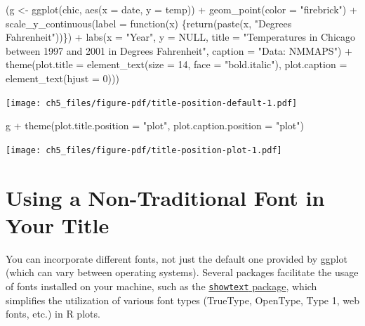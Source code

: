 \documentclass[
  letterpaper,
  DIV=11,
  numbers=noendperiod]{scrreprt}
\newenvironment{Shaded}{\begin{snugshade}}{\end{snugshade}}
\newcommand{\AttributeTok}[1]{\textcolor[rgb]{0.40,0.45,0.13}{#1}}
\newcommand{\ConstantTok}[1]{\textcolor[rgb]{0.56,0.35,0.01}{#1}}
\newcommand{\ControlFlowTok}[1]{\textcolor[rgb]{0.00,0.23,0.31}{#1}}
\newcommand{\DecValTok}[1]{\textcolor[rgb]{0.68,0.00,0.00}{#1}}
\newcommand{\FunctionTok}[1]{\textcolor[rgb]{0.28,0.35,0.67}{#1}}
\newcommand{\NormalTok}[1]{\textcolor[rgb]{0.00,0.23,0.31}{#1}}
\newcommand{\OtherTok}[1]{\textcolor[rgb]{0.00,0.23,0.31}{#1}}
\newcommand{\SpecialCharTok}[1]{\textcolor[rgb]{0.37,0.37,0.37}{#1}}
\newcommand{\StringTok}[1]{\textcolor[rgb]{0.13,0.47,0.30}{#1}}
\begin{document}
\begin{Shaded}
\begin{Highlighting}[]
\NormalTok{(g }\OtherTok{\textless{}{-}} \FunctionTok{ggplot}\NormalTok{(chic, }\FunctionTok{aes}\NormalTok{(}\AttributeTok{x =}\NormalTok{ date, }\AttributeTok{y =}\NormalTok{ temp)) }\SpecialCharTok{+}
  \FunctionTok{geom\_point}\NormalTok{(}\AttributeTok{color =} \StringTok{"firebrick"}\NormalTok{) }\SpecialCharTok{+}
  \FunctionTok{scale\_y\_continuous}\NormalTok{(}\AttributeTok{label =} \ControlFlowTok{function}\NormalTok{(x) \{}\FunctionTok{return}\NormalTok{(}\FunctionTok{paste}\NormalTok{(x, }\StringTok{"Degrees Fahrenheit"}\NormalTok{))\}) }\SpecialCharTok{+}
  \FunctionTok{labs}\NormalTok{(}\AttributeTok{x =} \StringTok{"Year"}\NormalTok{, }\AttributeTok{y =} \ConstantTok{NULL}\NormalTok{,}
       \AttributeTok{title =} \StringTok{"Temperatures in Chicago between 1997 and 2001 in Degrees Fahrenheit"}\NormalTok{,}
       \AttributeTok{caption =} \StringTok{"Data: NMMAPS"}\NormalTok{) }\SpecialCharTok{+}
  \FunctionTok{theme}\NormalTok{(}\AttributeTok{plot.title =} \FunctionTok{element\_text}\NormalTok{(}\AttributeTok{size =} \DecValTok{14}\NormalTok{, }\AttributeTok{face =} \StringTok{"bold.italic"}\NormalTok{),}
        \AttributeTok{plot.caption =} \FunctionTok{element\_text}\NormalTok{(}\AttributeTok{hjust =} \DecValTok{0}\NormalTok{)))}
\end{Highlighting}
\end{Shaded}

\texttt{[image: ch5\_files/figure-pdf/title-position-default-1.pdf]}

\begin{Shaded}
\begin{Highlighting}[]
\NormalTok{g }\SpecialCharTok{+} \FunctionTok{theme}\NormalTok{(}\AttributeTok{plot.title.position =} \StringTok{"plot"}\NormalTok{,}
          \AttributeTok{plot.caption.position =} \StringTok{"plot"}\NormalTok{)}
\end{Highlighting}
\end{Shaded}

\texttt{[image: ch5\_files/figure-pdf/title-position-plot-1.pdf]}

\section{Using a Non-Traditional Font in Your
Title}\label{using-a-non-traditional-font-in-your-title}

You can incorporate different fonts, not just the default one provided
by ggplot (which can vary between operating systems). Several packages
facilitate the usage of fonts installed on your machine, such as the
\href{https://github.com/yixuan/showtext}{\texttt{showtext} package},
which simplifies the utilization of various font types (TrueType,
OpenType, Type 1, web fonts, etc.) in R plots.
\end{document}
